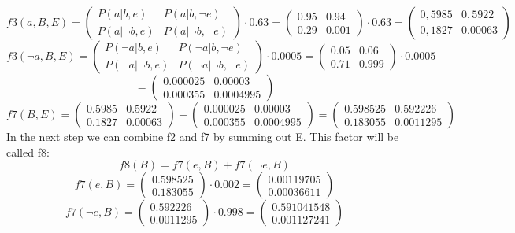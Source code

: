 \documentclass[11pt]{article}
\begin{document}
$$
  f3(a,B,E) = 
\begin{pmatrix}
  P(a|b,e) & P(a|b,\neg e) \\
  P(a|\neg b,e) & P(a|\neg b,\neg e)
\end{pmatrix} \cdot 0.63
=
\begin{pmatrix}
  0.95 & 0.94 \\
  0.29 & 0.001
\end{pmatrix} \cdot 0.63
= 
\begin{pmatrix}
  0,5985 & 0,5922 \\
  0,1827 & 0.00063
\end{pmatrix} 
$$
$$
  f3(\neg a,B,E) = 
\begin{pmatrix}
  P(\neg a|b,e) & P(\neg a|b,\neg e) \\
  P(\neg a|\neg b,e) & P(\neg a|\neg b,\neg e)
\end{pmatrix} \cdot 0.0005
=
\begin{pmatrix}
  0.05 & 0.06 \\
  0.71 & 0.999
\end{pmatrix} \cdot 0.0005
$$
$$
=
\begin{pmatrix}
  0.000025 & 0.00003 \\
  0.000355 & 0.0004995
\end{pmatrix}
$$
$$
f7(B,E) = 
\begin{pmatrix}
  0.5985 & 0.5922 \\
  0.1827 & 0.00063
\end{pmatrix}
+
\begin{pmatrix}
  0.000025 & 0.00003 \\
  0.000355 & 0.0004995
\end{pmatrix}
=
\begin{pmatrix}
  0.598525 & 0.592226 \\
  0.183055 & 0.0011295
\end{pmatrix}
$$
In the next step we can combine f2 and f7 by summing out E. This factor will be called f8:
$$
f8(B) = f7(e, B) + f7(\neg e, B)
$$
$$
f7(e, B) = 
\begin{pmatrix}
  0.598525 \\
  0.183055 
\end{pmatrix} \cdot 0.002
=
\begin{pmatrix}
  0.00119705 \\
  0.00036611 
\end{pmatrix}
$$
$$
f7(\neg e, B) = 
\begin{pmatrix}
  0.592226 \\
  0.0011295 
\end{pmatrix} \cdot 0.998
=
\begin{pmatrix}
  0.591041548 \\
  0.001127241 
\end{pmatrix}
$$
\end{document}
